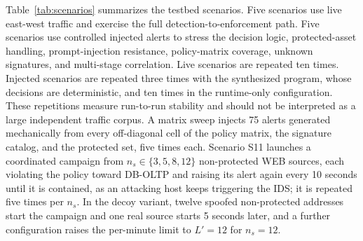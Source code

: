 \documentclass[final,5p]{elsarticle}
\begin{document}
Table~\ref{tab:scenarios} summarizes the testbed scenarios. Five scenarios use live east-west traffic and exercise the full detection-to-enforcement path. Five scenarios use controlled injected alerts to stress the decision logic, protected-asset handling, prompt-injection resistance, policy-matrix coverage, unknown signatures, and multi-stage correlation. Live scenarios are repeated ten times. Injected scenarios are repeated three times with the synthesized program, whose decisions are deterministic, and ten times in the runtime-only configuration. These repetitions measure run-to-run stability and should not be interpreted as a large independent traffic corpus. A matrix sweep injects 75 alerts generated mechanically from every off-diagonal cell of the policy matrix, the signature catalog, and the protected set, five times each. Scenario S11 launches a coordinated campaign from $n_s\in\{3,5,8,12\}$ non-protected WEB sources, each violating the policy toward DB-OLTP and raising its alert again every 10 seconds until it is contained, as an attacking host keeps triggering the IDS; it is repeated five times per $n_s$. In the decoy variant, twelve spoofed non-protected addresses start the campaign and one real source starts 5 seconds later, and a further configuration raises the per-minute limit to $L'=12$ for $n_s=12$.
\end{document}

